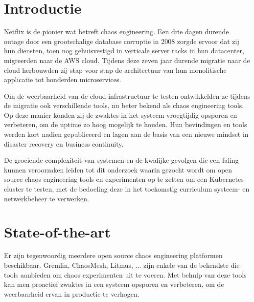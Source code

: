 
\section{Introductie} %
\label{sec:introductie}

Netflix is de pionier wat betreft chaos engineering. Een drie dagen durende outage door een grootschalige database corruptie in 2008 zorgde ervoor dat zij hun diensten, toen nog gehuisvestigd in verticale server racks in hun datacenter, migreerden naar de AWS cloud. Tijdens deze zeven jaar durende migratie naar de cloud herbouwden zij stap voor stap de architectuur van hun monolitische applicatie tot honderden microservices.
  
Om de weerbaarheid van de cloud infrastructuur te testen ontwikkelden ze tijdens de migratie ook verschillende tools, nu beter bekend als chaos engineering tools. Op deze manier konden zij de zwaktes in het systeem vroegtijdig opsporen en verbeteren, om de uptime zo hoog mogelijk te houden. Hun bevindingen en tools werden kort nadien gepubliceerd en lagen aan de basis van een nieuwe mindset in disaster recovery en business continuity.    
 
De groeiende complexiteit van systemen en de kwalijke gevolgen die een faling kunnen veroorzaken leiden tot dit onderzoek waarin gezocht wordt om open source chaos engineering tools en experimenten op te zetten om een Kubernetes cluster te testen, met de bedoeling deze in het toekomstig curriculum systeem- en netwerkbeheer te verwerken. 
 
 

\section{State-of-the-art}
\label{sec:state-of-the-art}

Er zijn tegenwoordig meerdere open source chaos engineering platformen beschikbaar. Gremlin, ChaosMesh, Litmus, ... zijn enkele van de bekendste die tools aanbieden om chaos experimenten uit te voeren. Met behulp van deze tools kan men proactief zwaktes in een systeem opsporen en verbeteren, om de weerbaarheid ervan in productie te verhogen.

